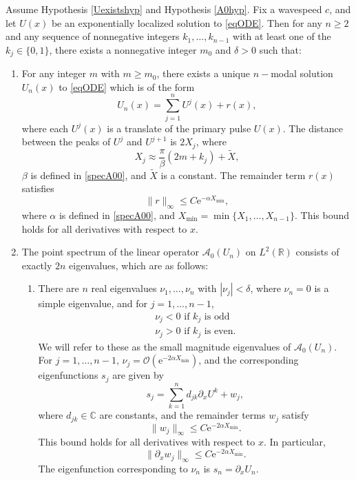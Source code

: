 \documentclass[review,onefignum,onetabnum]{siamart171218}
\newcommand{\C}{\mathbb{C}}
\newcommand{\R}{\mathbb{R}}
\newcommand{\rme}{\mathrm{e}}
\newcommand{\calA}{\mathcal{A}}
\begin{document}
\begin{theorem}\label{multiexist}
Assume Hypothesis \ref{Uexistshyp} and Hypothesis \ref{A0hyp}. Fix a wavespeed $c$, and let $U(x)$ be an exponentially localized solution to \cref{eqODE}. Then for any $n \geq 2$ and any sequence of nonnegative integers $k_1, \dots, k_{n-1}$ with at least one of the $k_j \in \{0, 1 \}$, there exists a nonnegative integer $m_0$ and $\delta > 0$ such that:
\begin{enumerate}%
	\item For any integer $m$ with $m \geq m_0$, there exists a unique $n-$modal solution $U_n(x)$ to \cref{eqODE} which is of the form
	\begin{equation}\label{qn}
	U_n(x) = \sum_{j = 1}^{n} U^j(x) + r(x),
	\end{equation}
	where each $U^j(x)$ is a translate of the primary pulse $U(x)$. The distance between the peaks of $U^j$ and $U^{j+1}$ is $2 X_j$, where
	\begin{equation*}
	X_j \approx \frac{\pi}{\beta}(2 m + k_j) + \tilde{X},
	\end{equation*}
	$\beta$ is defined in \cref{specA00}, and $\tilde{X}$ is a constant. The remainder term $r(x)$ satisfies
	\begin{equation}\label{rbound}
	\|r\|_\infty \leq C \rme^{-\alpha X_{\mathrm{min}}},
	\end{equation}
	where $\alpha$ is defined in \cref{specA00}, and $X_{\mathrm{min}} = \min\{X_1, \dots, X_{n-1}\}$. This bound holds for all derivatives with respect to $x$.

	\item The point spectrum of the linear operator $\calA_0(U_n)$ on $L^2(\R)$ consists of exactly $2n$ eigenvalues, which are as follows:
  \begin{enumerate}
    \item There are $n$ real eigenvalues $\nu_1, \dots, \nu_n$ with $|\nu_j| < \delta$, where $\nu_n = 0$ is a simple eigenvalue, and for $j = 1, \dots, n-1$,
    \[
  	\begin{array}{l}
  	\nu_j < 0 \text{ if } k_j \text{ is odd} \\
  	\nu_j > 0 \text{ if } k_j \text{ is even.}
  	\end{array}
    \]
    We will refer to these as the small magnitude eigenvalues of $\calA_0(U_n)$. For $j = 1, \dots, n-1$, $\nu_j = \mathcal{O}(\rme^{-2\alpha X_{\mathrm{min}}})$, and the corresponding eigenfunctions $s_j$ are given by
  	\begin{equation}\label{sj}
  	s_j = \sum_{k = 1}^{n} d_{jk}\partial_x U^k + w_j,
  	\end{equation}
  	where $d_{jk} \in \C$ are constants, and the remainder terms $w_j$ satisfy
  	\begin{equation}\label{sjwbound}
  	\|w_j\|_\infty \leq C\rme^{-2 \alpha X_{\mathrm{min}}}.
  	\end{equation}
    This bound holds for all derivatives with respect to $x$. In particular,
    \[
    \| \partial_x w_j\|_\infty \leq C\rme^{-2 \alpha X_{\mathrm{min}}}.
    \]
    The eigenfunction corresponding to $\nu_n$ is $s_n = \partial_x U_n$.


\end{enumerate}
\end{enumerate}
\end{theorem}
\end{document}
